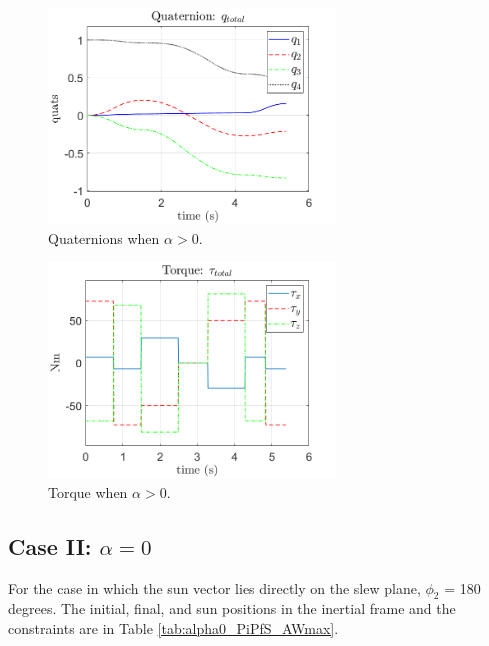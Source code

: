 \documentclass[letterpaper, preprint, paper,11pt]{AAS}	%
\begin{document}
\begin{multicols}{2}
	\begin{figure}[H]
		\begin{center}
			\includegraphics[width=3in]{figures/alphaNot0/quats_phi_total.png}
			\caption{Quaternions when $\alpha>0$.}
			\label{fig:quats_phi_total}
		\end{center}
	\end{figure}
	\columnbreak
	\begin{figure}[H]
		\begin{center}
			\includegraphics[width=3in]{figures/alphaNot0/torque_total.png}
		\end{center}
		\caption{Torque when $\alpha>0$.}
		\label{fig:torque_total}
	\end{figure}
\end{multicols}

\subsection{Case II: $\alpha = 0$} 

For the case in which the sun vector lies directly on the slew plane, $\phi_2$ = 180 degrees. The initial, final, and sun positions in the inertial frame and the constraints are in Table \ref{tab:alpha0_PiPfS_AWmax}. 
\end{document}
